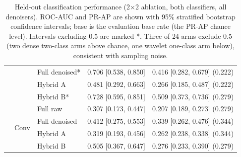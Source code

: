 \documentclass[ %
                    author={Daniel Page},
                supervisor={Dr. Andrew Calway},
                    degree={MSc},
                     title={Some Structural Guidelines for Data Science MSc Theses, Including Those With Long Titles that Run Across Multiple Lines on the Front Page},
                  subtitle={And those including an optional subtitle too, for good measure},
                      type={},
                      year={2021}]{dissertation}
\begin{document}
\begin{table}[H]
\begin{tabular}{lllcc}
     & & Full denoised* & 0.706 [0.538, 0.850] & 0.416 [0.282, 0.679] (0.222) \\
     & & Hybrid A      & 0.481 [0.292, 0.663] & 0.266 [0.185, 0.487] (0.222) \\
     & & Hybrid B*     & 0.728 [0.595, 0.851] & 0.509 [0.373, 0.736] (0.279) \\
    \cmidrule{2-5}
     & \multirow{4}{*}{Conv}
       & Full raw      & 0.307 [0.173, 0.447] & 0.207 [0.189, 0.273] (0.279) \\
     & & Full denoised & 0.412 [0.275, 0.553] & 0.339 [0.262, 0.476] (0.344) \\
     & & Hybrid A      & 0.319 [0.193, 0.456] & 0.262 [0.238, 0.338] (0.344) \\
     & & Hybrid B      & 0.505 [0.367, 0.647] & 0.276 [0.233, 0.390] (0.279) \\
    \bottomrule
    \end{tabular}
    \caption{Held-out classification performance (2$\times$2 ablation, both classifiers, all denoisers). ROC-AUC and PR-AP are shown with 95\% stratified bootstrap confidence intervals; base is the evaluation base rate (the PR-AP chance level). Intervals excluding 0.5 are marked *. Three of 24 arms exclude 0.5 (two dense two-class arms above chance, one wavelet one-class arm below), consistent with sampling noise.}
    \label{tab:classification-heldout}
\end{table}
\end{document}
